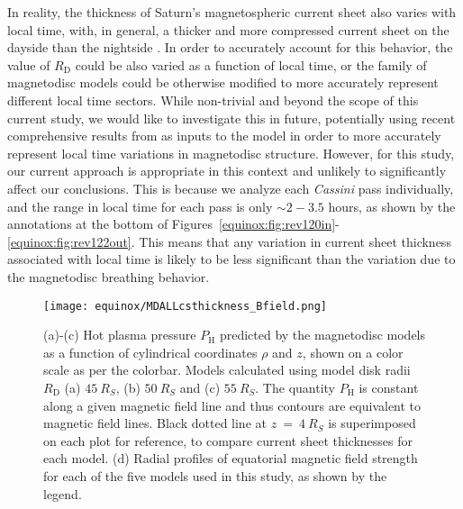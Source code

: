 In reality, the thickness of Saturn's magnetospheric current sheet also varies with local time, with, in general, a thicker and more compressed current sheet on the dayside than the nightside \citep[e.g.][]{arridge2008}. In order to accurately account for this behavior, the value of $R_\mathrm{D}$ could be also varied as a function of local time, or the family of magnetodisc models could be otherwise modified to more accurately represent different local time sectors. While non-trivial and beyond the scope of this current study, we would like to investigate this in future, potentially using recent comprehensive results from \citet{sergis2017} as inputs to the \citet{achilleos2010a} model in order to more accurately represent local time variations in magnetodisc structure. However, for this study, our current approach is appropriate in this context and unlikely to significantly affect our conclusions. This is because we analyze each \textit{Cassini} pass individually, and the range in local time for each pass is only $\sim2-3.5$ hours, as shown by the annotations at the bottom of Figures~\ref{equinox:fig:rev120in}{\--}\ref{equinox:fig:rev122out}. This means that any variation in current sheet thickness associated with local time is likely to be less significant than the variation due to the magnetodisc breathing behavior.
\begin{figure}
\centering
\texttt{[image: equinox/MDALLcsthickness\_Bfield.png]}
\caption[Magnetic field structure for $R_\mathrm{D}$ = $45, 50$ and $\SI{55}{R_S}$ magnetodisc models.]{(a)-(c) Hot plasma pressure $P_\mathrm{H}$ predicted by the magnetodisc models as a function of cylindrical coordinates $\rho$ and $z$, shown on a color scale as per the colorbar. Models calculated using model disk radii $R_\mathrm{D}$ (a) $\SI{45}{R_S}$, (b) $\SI{50}{R_S}$ and (c) $\SI{55}{R_S}$. The quantity $P_\mathrm{H}$ is constant along a given magnetic field line and thus contours are equivalent to magnetic field lines. Black dotted line at $z~{=}~\SI{4}{R_S}$ is superimposed on each plot for reference, to compare current sheet thicknesses for each model. (d) Radial profiles of equatorial magnetic field strength for each of the five models used in this study, as shown by the legend.}
\label{equinox:fig:MDALLcsthickness}
\end{figure}

